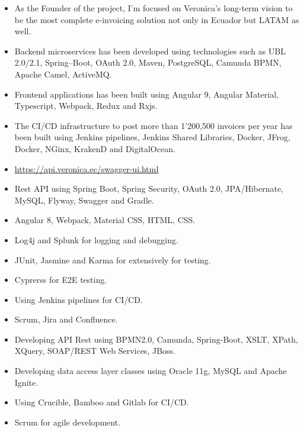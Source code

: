 \documentclass[10pt,a4paper,ragged2e]{altacv}
\begin{document}
\begin{itemize}
    \item As the Founder of the project, I’m focused on Veronica’s long-term vision to be the most complete e-invoicing solution not only in Ecuador but LATAM as well.
    \item Backend microservices has been developed using technologies such as UBL 2.0/2.1, Spring--Boot, OAuth 2.0, Maven, PostgreSQL, Camunda BPMN, Apache Camel, ActiveMQ.
    \item Frontend applications has been built using Angular 9, Angular Material, Typescript, Webpack, Redux and Rxjs.
    \item The CI/CD infrastructure to post more than 1'200,500 invoices per year has been built using Jenkins pipelines, Jenkins Shared Libraries, Docker, JFrog, Docker, NGinx, KrakenD and DigitalOcean.
    \item \url{https://api.veronica.ec/swagger-ui.html}
\end{itemize}

\vspace{10px}

\begin{itemize}
    \item Rest API using Spring Boot, Spring Security, OAuth 2.0, JPA/Hibernate, MySQL, Flyway, Swagger and Gradle.
    \item Angular 8, Webpack, Material CSS, HTML, CSS.
    \item Log4j and Splunk for logging and debugging.
    \item JUnit, Jasmine and Karma for extensively for testing.
    \item Cyprerss for E2E testing.
    \item Using Jenkins pipelines for CI/CD.
    \item Scrum, Jira and Confluence.
\end{itemize}

\vspace{10px}

\begin{itemize}
    \item Developing API Rest using BPMN2.0, Camunda, Spring-Boot, XSLT, XPath, XQuery, SOAP/REST Web Services, JBoss.
    \item Developing data access layer classes using Oracle 11g, MySQL and Apache Ignite.
    \item Using Crucible, Bamboo and Gitlab for CI/CD.
    \item Scrum for agile development.
\end{itemize}
\end{document}
